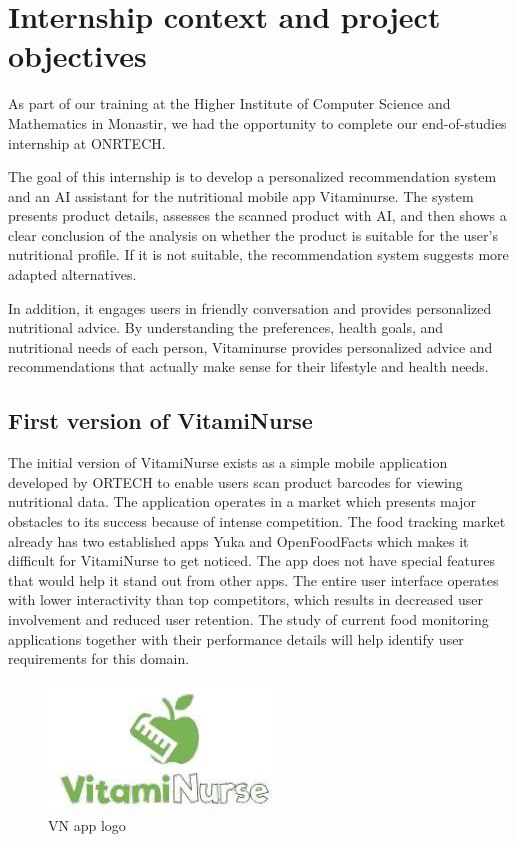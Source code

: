 \section{Internship context and project objectives}
As part of our training at the Higher Institute of Computer Science and Mathematics in Monastir, we had the opportunity to complete our end-of-studies internship at ONRTECH.

 The goal of this internship is to develop a personalized recommendation system and an AI assistant for the nutritional mobile app Vitaminurse. The system presents product details, assesses the scanned product with AI, and then shows a clear conclusion of the analysis on whether the product is suitable for the user’s nutritional profile. If it is not suitable, the recommendation system suggests more adapted alternatives.

In addition, it engages users in friendly conversation and provides personalized nutritional advice. By understanding the preferences, health goals, and nutritional needs of each person, Vitaminurse provides personalized advice and recommendations that actually make sense for their lifestyle and health needs. 
\subsection{First version of VitamiNurse}
The initial version of VitamiNurse exists as a simple mobile application developed by ORTECH  to enable users scan product barcodes for viewing nutritional data. The application operates in a market which presents major obstacles to its success because of intense competition. The food tracking market already has two established apps Yuka and OpenFoodFacts which makes it difficult for VitamiNurse to get noticed. The app does not have special features that would help it stand out from other apps. The entire user interface operates with lower interactivity than top competitors, which results in decreased user involvement and reduced user retention. The study of current food monitoring applications together with their performance details will help identify user requirements for this domain.

\begin{center}
\begin{figure}[ht]
            \centering
            \includegraphics[scale=0.55]{images/VN_app_logo.png}
            \caption{VN app logo} 
            \label{fig:VN app logo}
        \end{figure}
\end{center}

